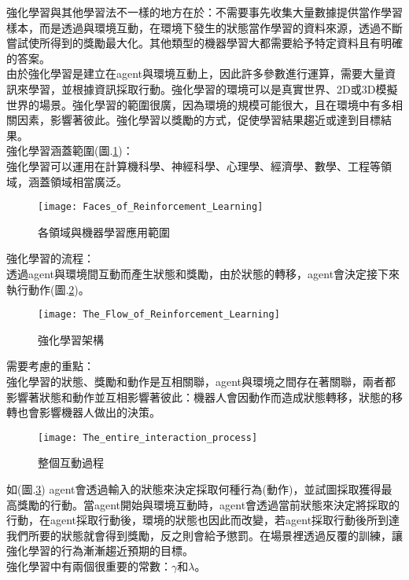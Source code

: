 強化學習與其他學習法不一樣的地方在於：不需要事先收集大量數據提供當作學習樣本，而是透過與環境互動，在環境下發生的狀態當作學習的資料來源，透過不斷嘗試使所得到的獎勵最大化。其他類型的機器學習大都需要給予特定資料且有明確的答案。\\

由於強化學習是建立在agent與環境互動上，因此許多參數進行運算，需要大量資訊來學習，並根據資訊採取行動。強化學習的環境可以是真實世界、2D或3D模擬世界的場景。強化學習的範圍很廣，因為環境的規模可能很大，且在環境中有多相關因素，影響著彼此。強化學習以獎勵的方式，促使學習結果趨近或達到目標結果。\\

強化學習涵蓋範圍(圖.\ref{各領域與機器學習應用範圍})：\\
 強化學習可以運用在計算機科學、神經科學、心理學、經濟學、數學、工程等領域，涵蓋領域相當廣泛。
\begin{figure}[hbt!]
\begin{center}
\texttt{[image: Faces\_of\_Reinforcement\_Learning]}
\caption{\Large 各領域與機器學習應用範圍}
\label{各領域與機器學習應用範圍}
\end{center}
\end{figure}
\newpage
強化學習的流程：\\
透過agent與環境間互動而產生狀態和獎勵，由於狀態的轉移，agent會決定接下來執行動作(圖.\ref{RL structur})。\\[12pt]

\begin{figure}[hbt!]
\begin{center}
\texttt{[image: The\_Flow\_of\_Reinforcement\_Learning]}
\caption{\Large 強化學習架構}
\label{RL structur}
\end{center}
\end{figure}
需要考慮的重點：\\
強化學習的狀態、獎勵和動作是互相關聯，agent與環境之間存在著關聯，兩者都影響著狀態和動作並互相影響著彼此：機器人會因動作而造成狀態轉移，狀態的移轉也會影響機器人做出的決策。\\
\newpage
\begin{figure}[hbt!]
\begin{center}
\texttt{[image: The\_entire\_interaction\_process]}
\caption{\Large 整個互動過程}
\label{整個互動過程}
\end{center}
\end{figure}
 如(圖.\ref{整個互動過程}) agent會透過輸入的狀態來決定採取何種行為(動作)，並試圖採取獲得最高獎勵的行動。當agent開始與環境互動時，agent會透過當前狀態來決定將採取的行動，在agent採取行動後，環境的狀態也因此而改變，若agent採取行動後所到達我們所要的狀態就會得到獎勵，反之則會給予懲罰。在場景裡透過反覆的訓練，讓強化學習的行為漸漸趨近預期的目標。\\
 強化學習中有兩個很重要的常數：$\gamma$和$\lambda$。\\
 
